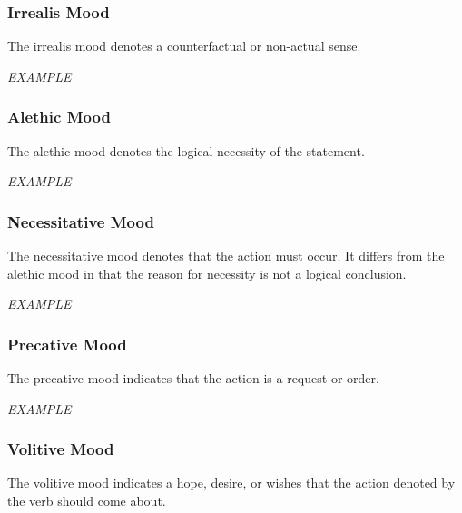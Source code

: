 \documentclass[grammar]{subfiles}
\begin{document}
  \subsubsection{Irrealis Mood}
  \label{sssec:vm_irrealis}

  The irrealis mood denotes a counterfactual or non-actual sense.

  \begin{exe}
    \ex \emph{EXAMPLE}
  \end{exe}

  \subsubsection{Alethic Mood}
  \label{sssec:vm_alethic}

  The alethic mood denotes the logical necessity of the statement.

  \begin{exe}
    \ex \emph{EXAMPLE}
  \end{exe}

  \subsubsection{Necessitative Mood}
  \label{sssec:vm_necessitative}

  The necessitative mood denotes that the action must occur. It differs from the alethic mood in that the reason for necessity is not a logical conclusion.

  \begin{exe}
    \ex \emph{EXAMPLE}
  \end{exe}

  \subsubsection{Precative Mood}
  \label{sssec:vm_precative}

  The precative mood indicates that the action is a request or order.

  \begin{exe}
    \ex \emph{EXAMPLE}
  \end{exe}

  \subsubsection{Volitive Mood}
  \label{sssec:vm_optative}

  The volitive mood indicates a hope, desire, or wishes that the action denoted by the verb should come about.
\end{document}
